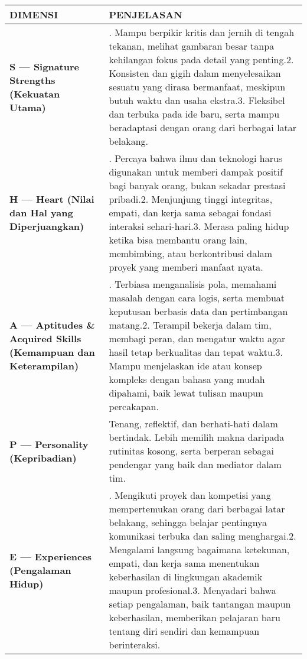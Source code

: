 \documentclass[
  letterpaper,
  DIV=11,
  numbers=noendperiod]{scrreprt}
\begin{document}
\begin{longtable}[]{@{}
  >{\raggedright\arraybackslash}p{}
  >{\raggedright\arraybackslash}p{}@{}}
\toprule\noalign{}
\begin{minipage}[b]{\linewidth}\raggedright
DIMENSI
\end{minipage} & \begin{minipage}[b]{\linewidth}\raggedright
PENJELASAN
\end{minipage} \\
\midrule\noalign{}
\endhead
\bottomrule\noalign{}
\endlastfoot
\textbf{S --- Signature Strengths (Kekuatan Utama)} & 1. Mampu berpikir
kritis dan jernih di tengah tekanan, melihat gambaran besar tanpa
kehilangan fokus pada detail yang penting.2. Konsisten dan gigih dalam
menyelesaikan sesuatu yang dirasa bermanfaat, meskipun butuh waktu dan
usaha ekstra.3. Fleksibel dan terbuka pada ide baru, serta mampu
beradaptasi dengan orang dari berbagai latar belakang. \\
\textbf{H --- Heart (Nilai dan Hal yang Diperjuangkan)} & 1. Percaya
bahwa ilmu dan teknologi harus digunakan untuk memberi dampak positif
bagi banyak orang, bukan sekadar prestasi pribadi.2. Menjunjung tinggi
integritas, empati, dan kerja sama sebagai fondasi interaksi
sehari-hari.3. Merasa paling hidup ketika bisa membantu orang lain,
membimbing, atau berkontribusi dalam proyek yang memberi manfaat
nyata. \\
\textbf{A --- Aptitudes \& Acquired Skills (Kemampuan dan Keterampilan)}
& 1. Terbiasa menganalisis pola, memahami masalah dengan cara logis,
serta membuat keputusan berbasis data dan pertimbangan matang.2.
Terampil bekerja dalam tim, membagi peran, dan mengatur waktu agar hasil
tetap berkualitas dan tepat waktu.3. Mampu menjelaskan ide atau konsep
kompleks dengan bahasa yang mudah dipahami, baik lewat tulisan maupun
percakapan. \\
\textbf{P --- Personality (Kepribadian)} & Tenang, reflektif, dan
berhati-hati dalam bertindak. Lebih memilih makna daripada rutinitas
kosong, serta berperan sebagai pendengar yang baik dan mediator dalam
tim. \\
\textbf{E --- Experiences (Pengalaman Hidup)} & 1. Mengikuti proyek dan
kompetisi yang mempertemukan orang dari berbagai latar belakang,
sehingga belajar pentingnya komunikasi terbuka dan saling menghargai.2.
Mengalami langsung bagaimana ketekunan, empati, dan kerja sama
menentukan keberhasilan di lingkungan akademik maupun profesional.3.
Menyadari bahwa setiap pengalaman, baik tantangan maupun keberhasilan,
memberikan pelajaran baru tentang diri sendiri dan kemampuan
berinteraksi. \\
\end{longtable}
\end{document}
